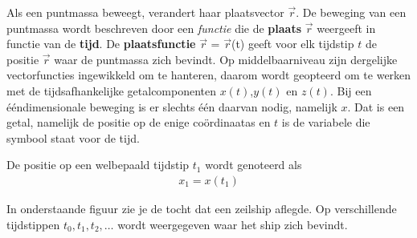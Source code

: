 \documentclass{ximera}
\begin{document}
Als een puntmassa beweegt, verandert haar plaatsvector \(\vec{r}\).  
De beweging van een puntmassa wordt beschreven door een \textit{functie} die de \textbf{plaats} \(\vec{r}\) weergeeft in functie van de \textbf{tijd}. 
De \textbf{plaatsfunctie} \(\vec{r}\) = \(\vec{r}\)(t) geeft voor elk tijdstip \(t\) de positie \(\vec{r}\) waar de puntmassa zich bevindt. 
Op middelbaarniveau zijn dergelijke vectorfuncties ingewikkeld om te hanteren, daarom wordt geopteerd om te werken met de tijdsafhankelijke getalcomponenten \(x(t)\),\(y(t)\) en \(z(t)\).
Bij een ééndimensionale beweging is er slechts één daarvan nodig, namelijk \(x\). Dat is een getal, namelijk de positie op de enige coördinaatas
en $t$ is de variabele die symbool staat voor de tijd.


De positie op een welbepaald tijdstip $t_1$ wordt genoteerd als 
\begin{eqnarray*}
x_1=x(t_1)
\end{eqnarray*}

In onderstaande figuur zie je de tocht dat een zeilship aflegde. 
Op verschillende tijdstippen $t_0,t_1, t_2,\ldots$ wordt weergegeven waar het ship zich bevindt. 




\end{document}
